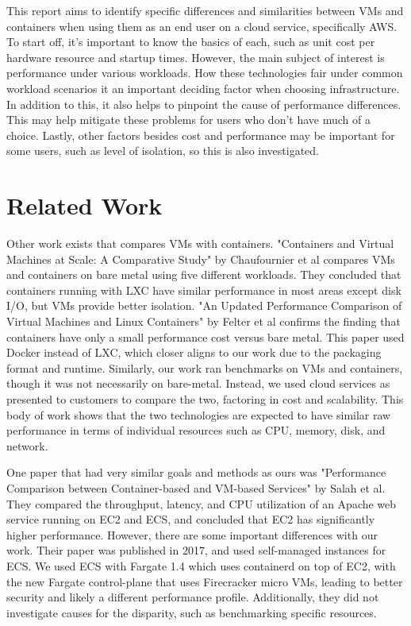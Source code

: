 \documentclass[11pt]{article}
\begin{document}
This report aims to identify specific differences and similarities between VMs and containers when using them as an end user on a cloud service, specifically AWS. To start off, it's important to know the basics of each, such as unit cost per hardware resource and startup times. However, the main subject of interest is performance under various workloads. How these technologies fair under common workload scenarios it an important deciding factor when choosing infrastructure. In addition to this, it also helps to pinpoint the cause of performance differences. This may help mitigate these problems for users who don't have much of a choice. Lastly, other factors besides cost and performance may be important for some users, such as level of isolation, so this is also investigated.
\vspace{3mm} %


\section{Related Work}

Other work exists that compares VMs with containers. "Containers and Virtual Machines at Scale: A Comparative Study" by Chaufournier et al compares VMs and containers on bare metal using five different workloads. They concluded that containers running with LXC have similar performance in most areas except disk I/O, but VMs provide better isolation. "An Updated Performance Comparison of Virtual Machines and Linux Containers" by Felter et al confirms the finding that containers have only a small performance cost versus bare metal. This paper used Docker instead of LXC, which closer aligns to our work due to the packaging format and runtime. Similarly, our work ran benchmarks on VMs and containers, though it was not necessarily on bare-metal. Instead, we used cloud services as presented to customers to compare the two, factoring in cost and scalability. This body of work shows that the two technologies are expected to have similar raw performance in terms of individual resources such as CPU, memory, disk, and network.

One paper that had very similar goals and methods as ours was "Performance Comparison between Container-based and VM-based Services" by Salah et al. They compared the throughput, latency, and CPU utilization of an Apache web service running on EC2 and ECS, and concluded that EC2 has significantly higher performance. However, there are some important differences with our work. Their paper was published in 2017, and used self-managed instances for ECS. We used ECS with Fargate 1.4 which uses containerd on top of EC2, with the new Fargate control-plane that uses Firecracker micro VMs, leading to better security and likely a different performance profile. Additionally, they did not investigate causes for the disparity, such as benchmarking specific resources.
\end{document}
